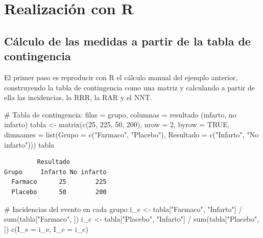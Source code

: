 \documentclass[
  spanish,
  a4paper,
]{scrreport}
\newenvironment{Shaded}{\begin{snugshade}}{\end{snugshade}}
\newcommand{\AttributeTok}[1]{\textcolor[rgb]{0.40,0.45,0.13}{#1}}
\newcommand{\CommentTok}[1]{\textcolor[rgb]{0.37,0.37,0.37}{#1}}
\newcommand{\ConstantTok}[1]{\textcolor[rgb]{0.56,0.35,0.01}{#1}}
\newcommand{\DecValTok}[1]{\textcolor[rgb]{0.68,0.00,0.00}{#1}}
\newcommand{\FunctionTok}[1]{\textcolor[rgb]{0.28,0.35,0.67}{#1}}
\newcommand{\NormalTok}[1]{\textcolor[rgb]{0.00,0.23,0.31}{#1}}
\newcommand{\OtherTok}[1]{\textcolor[rgb]{0.00,0.23,0.31}{#1}}
\newcommand{\SpecialCharTok}[1]{\textcolor[rgb]{0.37,0.37,0.37}{#1}}
\newcommand{\StringTok}[1]{\textcolor[rgb]{0.13,0.47,0.30}{#1}}
\theoremstyle{definition}
\theoremstyle{definition}
\theoremstyle{remark}
\begin{document}
\section{Realización con R}\label{realizaciuxf3n-con-r-5}

\subsection{Cálculo de las medidas a partir de la tabla de
contingencia}\label{cuxe1lculo-de-las-medidas-a-partir-de-la-tabla-de-contingencia-1}

El primer paso es reproducir con R el cálculo manual del ejemplo
anterior, construyendo la tabla de contingencia como una matriz y
calculando a partir de ella las incidencias, la RRR, la RAR y el NNT.

\begin{Shaded}
\begin{Highlighting}[]
\CommentTok{\# Tabla de contingencia: filas = grupo, columnas = resultado (infarto, no infarto)}
\NormalTok{tabla }\OtherTok{\textless{}{-}} \FunctionTok{matrix}\NormalTok{(}\FunctionTok{c}\NormalTok{(}\DecValTok{25}\NormalTok{, }\DecValTok{225}\NormalTok{, }\DecValTok{50}\NormalTok{, }\DecValTok{200}\NormalTok{),}
                 \AttributeTok{nrow =} \DecValTok{2}\NormalTok{, }\AttributeTok{byrow =} \ConstantTok{TRUE}\NormalTok{,}
                 \AttributeTok{dimnames =} \FunctionTok{list}\NormalTok{(}\AttributeTok{Grupo =} \FunctionTok{c}\NormalTok{(}\StringTok{"Farmaco"}\NormalTok{, }\StringTok{"Placebo"}\NormalTok{),}
                                  \AttributeTok{Resultado =} \FunctionTok{c}\NormalTok{(}\StringTok{"Infarto"}\NormalTok{, }\StringTok{"No infarto"}\NormalTok{)))}
\NormalTok{tabla}
\end{Highlighting}
\end{Shaded}

\begin{verbatim}
         Resultado
Grupo     Infarto No infarto
  Farmaco      25        225
  Placebo      50        200
\end{verbatim}

\begin{Shaded}
\begin{Highlighting}[]
\CommentTok{\# Incidencias del evento en cada grupo}
\NormalTok{i\_e }\OtherTok{\textless{}{-}}\NormalTok{ tabla[}\StringTok{"Farmaco"}\NormalTok{, }\StringTok{"Infarto"}\NormalTok{] }\SpecialCharTok{/} \FunctionTok{sum}\NormalTok{(tabla[}\StringTok{"Farmaco"}\NormalTok{, ])}
\NormalTok{i\_c }\OtherTok{\textless{}{-}}\NormalTok{ tabla[}\StringTok{"Placebo"}\NormalTok{, }\StringTok{"Infarto"}\NormalTok{] }\SpecialCharTok{/} \FunctionTok{sum}\NormalTok{(tabla[}\StringTok{"Placebo"}\NormalTok{, ])}
\FunctionTok{c}\NormalTok{(}\AttributeTok{I\_e =}\NormalTok{ i\_e, }\AttributeTok{I\_c =}\NormalTok{ i\_c)}
\end{Highlighting}
\end{Shaded}
\end{document}
